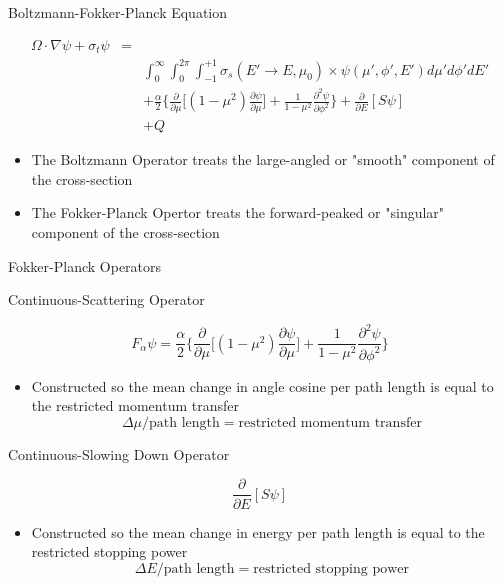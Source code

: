 \documentclass{beamer}
\begin{document}
\begin{frame}{Boltzmann-Fokker-Planck Equation}
 
    \begin{eqnarray*}
      \Omega \cdot \nabla \psi + \sigma_t\psi &= & \\
      & & \int_{0}^{\infty}\int_{0}^{2\pi}\int_{-1}^{+1} \sigma_s(E'\rightarrow E,\mu_0)
       \times\psi(\mu',\phi',E')d\mu'd\phi'dE' \\
       & &+ \frac{\alpha}{2}\Big\{ \frac{\partial}{\partial \mu} \Big[(1-\mu^2)\frac{\partial \psi}{\partial \mu}\Big]+ \frac{1}{1-\mu^2}\frac{\partial^2\psi}{\partial\phi^2}\Big\} + \frac{\partial}{\partial E} [S\psi] \\
       & &+ Q
    \end{eqnarray*}

     \begin{itemize}
       \item The Boltzmann Operator treats the large-angled or "smooth" component of the cross-section

      \item The Fokker-Planck Opertor treats the forward-peaked or "singular" component of the cross-section
       
     \end{itemize}

\end{frame}

\begin{frame}{Fokker-Planck Operators}
     
  \begin{block}{Continuous-Scattering Operator}

    $$F_{\alpha}\psi=\frac{\alpha}{2}\Big\{ \frac{\partial}{\partial \mu} 
        \Big[(1-\mu^2)\frac{\partial \psi}{\partial \mu}\Big]+ \frac{1}{1-\mu^2}\frac{\partial^2\psi}{\partial\phi^2}\Big\}$$
      
    \begin{itemize}
      \item Constructed so the mean change in angle cosine per path length is equal to the restricted momentum transfer $$ \Delta\mu/\text{path length} = \text{restricted momentum transfer}$$
    \end{itemize}
  \end{block}

  \begin{block}{Continuous-Slowing Down Operator}

    $$\frac{\partial}{\partial E} [S\psi]$$
      
    \begin{itemize}
      \item Constructed so the mean change in energy per path length is equal to the restricted stopping power $$ \Delta E/\text{path length} = \text{restricted stopping power}$$
    \end{itemize}

  \end{block}

\end{frame}
\end{document}
